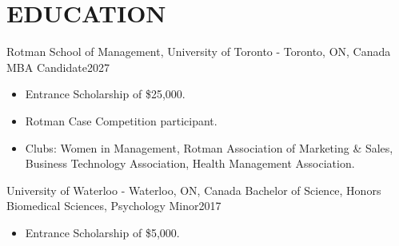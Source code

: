 
\section{\textcolor{airforceblue}{EDUCATION}}
  \employmentSubheadingListStart
    \employmentSubheading
      {Rotman School of Management, University of Toronto - Toronto, ON, Canada}{}
      {MBA Candidate}{2027}
      \begin{itemize}[leftmargin=1.5em]
        \item Entrance Scholarship of \$25,000.
        \item Rotman Case Competition participant.
        \item Clubs: Women in Management, Rotman Association of Marketing \& Sales, Business Technology Association, Health Management Association.
      \end{itemize}
    \employmentSubheading
      {University of Waterloo - Waterloo, ON, Canada}{}
      {Bachelor of Science, Honors Biomedical Sciences, Psychology Minor}{2017}
      \begin{itemize}[leftmargin=1.5em]
        \item Entrance Scholarship of \$5,000.
      \end{itemize}
  \employmentSubheadingListEnd
  \vspace{-16pt}
